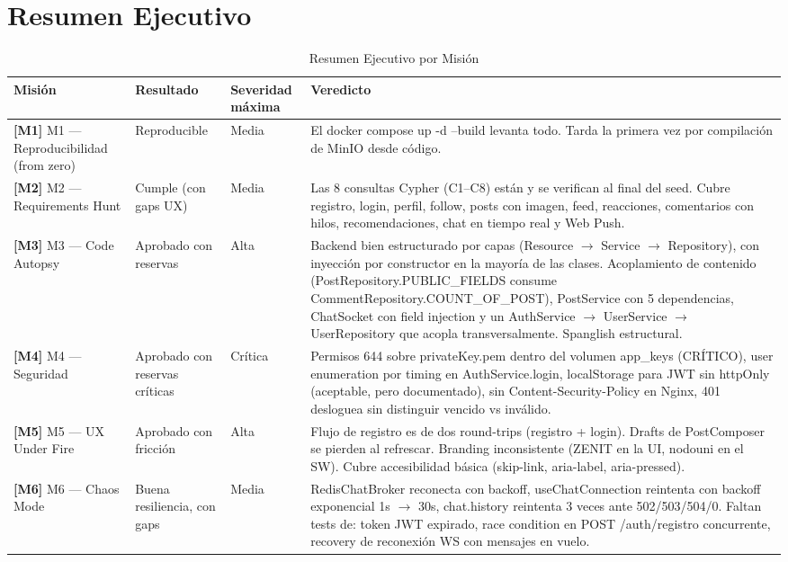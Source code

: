 \documentclass[10pt,a4paper]{article}
\begin{document}
\section*{Resumen Ejecutivo}
\begin{table}[htbp]
\centering\small
\begin{tabularx}{\textwidth}{p{3.8cm} p{2.2cm} p{2.5cm} X}
\rowcolor{tableheader}\toprule
Misión & Resultado & Severidad máxima & Veredicto \\ \midrule
{\textbf{[M1]}}  M1 --- Reproducibilidad (from zero) & Reproducible & Media & El docker compose up -d --build levanta todo. Tarda la primera vez por compilación de MinIO desde código. \\ \midrule
{\textbf{[M2]}}  M2 --- Requirements Hunt & Cumple (con gaps UX) & Media & Las 8 consultas Cypher (C1--C8) están y se verifican al final del seed. Cubre registro, login, perfil, follow, posts con imagen, feed, reacciones, comentarios con hilos, recomendaciones, chat en tiempo real y Web Push. \\ \midrule
{\textbf{[M3]}}  M3 --- Code Autopsy & Aprobado con reservas & Alta & Backend bien estructurado por capas (Resource $\rightarrow$ Service $\rightarrow$ Repository), con inyección por constructor en la mayoría de las clases. Acoplamiento de contenido (PostRepository.PUBLIC\_FIELDS consume CommentRepository.COUNT\_OF\_POST), PostService con 5 dependencias, ChatSocket con field injection y un AuthService $\rightarrow$ UserService $\rightarrow$ UserRepository que acopla transversalmente. Spanglish estructural. \\ \midrule
{\textbf{[M4]}}  M4 --- Seguridad & Aprobado con reservas críticas & Crítica & Permisos 644 sobre privateKey.pem dentro del volumen app\_keys (CRÍTICO), user enumeration por timing en AuthService.login, localStorage para JWT sin httpOnly (aceptable, pero documentado), sin Content-Security-Policy en Nginx, 401 desloguea sin distinguir vencido vs inválido. \\ \midrule
{\textbf{[M5]}}  M5 --- UX Under Fire & Aprobado con fricción & Alta & Flujo de registro es de dos round-trips (registro + login). Drafts de PostComposer se pierden al refrescar. Branding inconsistente (ZENIT en la UI, nodouni en el SW). Cubre accesibilidad básica (skip-link, aria-label, aria-pressed). \\ \midrule
{\textbf{[M6]}}  M6 --- Chaos Mode & Buena resiliencia, con gaps & Media & RedisChatBroker reconecta con backoff, useChatConnection reintenta con backoff exponencial 1s $\rightarrow$ 30s, chat.history reintenta 3 veces ante 502/503/504/0. Faltan tests de: token JWT expirado, race condition en POST /auth/registro concurrente, recovery de reconexión WS con mensajes en vuelo. \\ \midrule
\bottomrule
\end{tabularx}
\caption{Resumen Ejecutivo por Misión}
\end{table}
\end{document}
